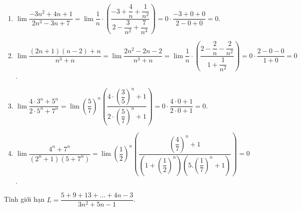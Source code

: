 \begin{ex}
{\begin{enumerate}
			 \item $\lim \dfrac{-3n^2+4n+1}{2n^3-3n+7}=\lim \dfrac{1}{n} \cdot\left(\dfrac{-3+\dfrac{4}{n}+\dfrac{1}{n^2}}{2-\dfrac{3}{n^2}+\dfrac{7}{n^3}}\right)=0\cdot \dfrac{-3+0+0}{2-0+0}=0$.
			\item $\lim \dfrac{(2n+1)(n-2)+n}{n^3+n}=\lim \dfrac{2n^2-2n-2}{n^3+n}=\lim \dfrac{1}{n}  \cdot\left(\dfrac{2-\dfrac{2}{n}-\dfrac{2}{n^2}}{1+\dfrac{1}{n^2}}\right)=0\cdot \dfrac{2-0-0}{1+0}=0$.
			\item $\lim \dfrac{4\cdot  3^n+5^n}{2\cdot 5^n+7^n}=\lim \left(\dfrac{5}{7}\right)^n\left(\dfrac{4\cdot\left(\dfrac{3}{5}\right)^n+1}{2\cdot\left(\dfrac{5}{7}\right)^n+1}\right)=0\cdot \dfrac{4\cdot 0+1}{2\cdot 0+1}=0$.
			\item $\lim  \dfrac{4^n+7^n}{\left(2^n+1\right)\left(5+7^n\right)}=\lim \left(\dfrac{1}{2}\right)^n\left(\dfrac{\left(\dfrac{4}{7}\right)^n+1}{\left(1+\left(\dfrac{1}{2}\right)^n\right)\left(5.\left(\dfrac{1}{7}\right)^n+1\right)}\right)=0$.
		\end{enumerate}
	 }
\end{ex}

\begin{bt}%
	Tính giới hạn $L=\dfrac{5 + 9 + 13 + \dots + 4n - 3}{3n^2 + 5n - 1}$. 
\end{bt}

